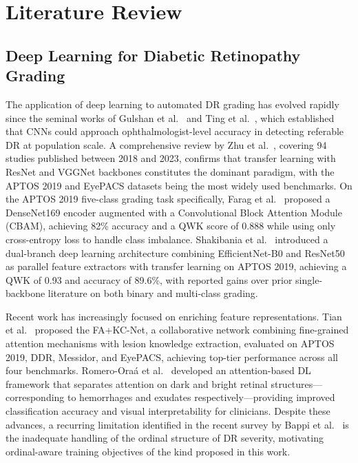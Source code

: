 \documentclass[a4paper,fleqn]{cas-dc}
\begin{document}
\section{Literature Review}

\subsection{Deep Learning for Diabetic Retinopathy Grading}

The application of deep learning to automated DR grading has evolved rapidly since the seminal works of Gulshan et al.\ \cite{gulshan2016} and Ting et al.\ \cite{ting2017}, which established that CNNs could approach ophthalmologist-level accuracy in detecting referable DR at population scale. A comprehensive review by Zhu et al.\ \cite{zhu2024}, covering 94 studies published between 2018 and 2023, confirms that transfer learning with ResNet and VGGNet backbones constitutes the dominant paradigm, with the APTOS 2019 and EyePACS datasets being the most widely used benchmarks. On the APTOS 2019 five-class grading task specifically, Farag et al.\ \cite{farag2022} proposed a DenseNet169 encoder augmented with a Convolutional Block Attention Module (CBAM), achieving 82\% accuracy and a QWK score of 0.888 while using only cross-entropy loss to handle class imbalance. Shakibania et al.\ \cite{shakibania2024} introduced a dual-branch deep learning architecture combining EfficientNet-B0 and ResNet50 as parallel feature extractors with transfer learning on APTOS 2019, achieving a QWK of 0.93 and accuracy of 89.6\%, with reported gains over prior single-backbone literature on both binary and multi-class grading.

Recent work has increasingly focused on enriching feature representations. Tian et al.\ \cite{tian2023} proposed the FA+KC-Net, a collaborative network combining fine-grained attention mechanisms with lesion knowledge extraction, evaluated on APTOS 2019, DDR, Messidor, and EyePACS, achieving top-tier performance across all four benchmarks. Romero-Ora\'{a} et al.\ \cite{romero2024} developed an attention-based DL framework that separates attention on dark and bright retinal structures---corresponding to hemorrhages and exudates respectively---providing improved classification accuracy and visual interpretability for clinicians. Despite these advances, a recurring limitation identified in the recent survey by Bappi et al.\ \cite{bappi2025} is the inadequate handling of the ordinal structure of DR severity, motivating ordinal-aware training objectives of the kind proposed in this work.
\end{document}
